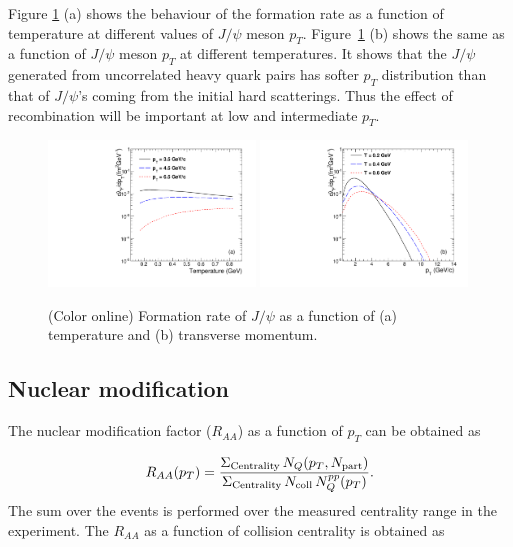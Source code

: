 \documentclass[12pt,a4paper,final]{iopart} %
\newcommand{\Jpsi}{J/\psi}
\newcommand{\pT}{p_{T}}
\newcommand{\raa}{R_{AA}}
\begin{document}
Figure \ref{fig:ForRateVsTempAndPt} (a) shows the behaviour of the formation rate as a function 
of temperature at different values of $\Jpsi$ meson $\pT$.
Figure~\ref{fig:ForRateVsTempAndPt} (b) shows the same as a function
of $\Jpsi$ meson $p_T$ at different temperatures.
It shows that the $\Jpsi$ generated from uncorrelated heavy quark pairs has 
softer $p_{T}$ distribution than that of $\Jpsi$'s coming from the initial hard scatterings.
Thus the effect of recombination will be important at low and intermediate $p_T$.

\begin{figure}
\includegraphics[width=0.49\textwidth]{Fig3a_FormRateVsT.pdf}
\includegraphics[width=0.49\textwidth]{Fig3b_FormRateVsPt.pdf}
\caption{(Color online) Formation rate of  $\Jpsi$ as a function of (a) temperature and 
(b) transverse momentum.}
\label{fig:ForRateVsTempAndPt}
\end{figure}


\subsection{Nuclear modification}

The nuclear modification factor ($R_{AA}$) as a function of $p_T$ can be obtained as 

\begin{equation}
  R_{AA}(p_T)= \frac{ \Sigma_{\rm Centrality} \, N_Q(p_T,N_{\rm part})}
                    { \Sigma_{\rm Centrality} \, N_{\rm coll} \, N_{Q}^{pp}(p_T)}.
\label{raa}
\end{equation}
The sum over the events is performed over the measured centrality range in the
experiment. The $\raa$ as a function of collision centrality is obtained as
\end{document}
